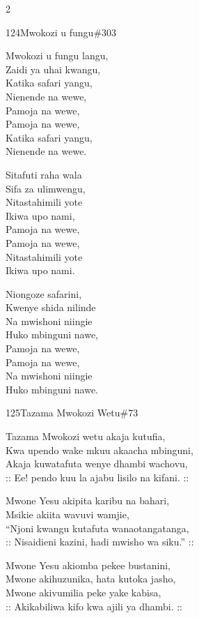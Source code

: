 \documentclass{article}
\begin{document}
\begin{multicols}{2}
\begin{hymn}{124}{Mwokozi u fungu}{\#303}
\begin{stanza}
Mwokozi u fungu langu,\\
Zaidi ya uhai kwangu,\\
Katika safari yangu,\\
Nienende na wewe,\\
Pamoja na wewe,\\
Pamoja na wewe,\\
Katika safari yangu,\\
Nienende na wewe.
\end{stanza}
\begin{stanza}
Sitafuti raha wala\\
Sifa za ulimwengu,\\
Nitastahimili yote\\
Ikiwa upo nami,\\
Pamoja na wewe,\\
Pamoja na wewe,\\
Nitastahimili yote\\
Ikiwa upo nami.
\end{stanza}
\begin{stanza}
Niongoze safarini,\\
Kwenye shida nilinde\\
Na mwishoni niingie\\
Huko mbinguni nawe,\\
Pamoja na wewe,\\
Pamoja na wewe,\\
Na mwishoni niingie\\
Huko mbinguni nawe.
\end{stanza}
\end{hymn}

\begin{hymn}{125}{Tazama Mwokozi Wetu}{\#73}
\begin{stanza}
Tazama Mwokozi wetu akaja kutufia,\\
Kwa upendo wake mkuu akaacha mbinguni,\\
Akaja kuwatafuta wenye dhambi wachovu,\\
:: Ee! pendo kuu la ajabu lisilo na kifani. ::
\end{stanza}
\begin{stanza}
Mwone Yesu akipita karibu na bahari,\\
Msikie akiita wavuvi wamjie,\\
``Njoni kwangu kutafuta wanaotangatanga,\\
:: Nisaidieni kazini, hadi mwisho wa siku.'' ::
\end{stanza}
\begin{stanza}
Mwone Yesu akiomba pekee bustanini,\\
Mwone akihuzunika, hata kutoka jasho,\\
Mwone akivumilia peke yake kabisa,\\
:: Akikabiliwa kifo kwa ajili ya dhambi. ::
\end{stanza}
\end{hymn}


\end{multicols}
\end{document}
